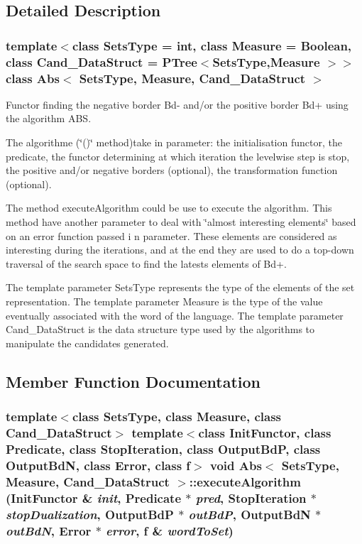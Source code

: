 \subsection{Detailed Description}
\subsubsection*{template$<$class Sets\-Type = int, class Measure = Boolean, class Cand\_\-Data\-Struct = PTree$<$Sets\-Type,Measure $>$$>$ class Abs$<$ Sets\-Type, Measure, Cand\_\-Data\-Struct $>$}

Functor finding the negative border Bd- and/or the positive border Bd+ using the algorithm ABS. 

The algorithme (\char`\"{}()\char`\"{} method)take in parameter: the initialisation functor, the predicate, the functor determining at which iteration the levelwise step is stop, the positive and/or negative borders (optional), the transformation function (optional).

The method execute\-Algorithm could be use to execute the algorithm. This method have another parameter to deal with \char`\"{}almost interesting elements\char`\"{} based on an error function passed i n parameter. These elements are considered as interesting during the iterations, and at the end they are used to do a top-down traversal of the search space to find the latests elements of Bd+.

The template parameter Sets\-Type represents the type of the elements of the set representation. The template parameter Measure is the type of the value eventually associated with the word of the language. The template parameter Cand\_\-Data\-Struct is the data structure type used by the algorithms to manipulate the candidates generated. 



\subsection{Member Function Documentation}
\subsubsection{\setlength{\rightskip}{0pt plus 5cm}template$<$class Sets\-Type, class Measure, class Cand\_\-Data\-Struct$>$ template$<$class Init\-Functor, class Predicate, class Stop\-Iteration, class Output\-Bd\-P, class Output\-Bd\-N, class Error, class f$>$ void {\bf Abs}$<$ Sets\-Type, Measure, Cand\_\-Data\-Struct $>$::execute\-Algorithm (Init\-Functor \& {\em init}, {\bf Predicate} $\ast$ {\em pred}, Stop\-Iteration $\ast$ {\em stop\-Dualization}, Output\-Bd\-P $\ast$ {\em out\-Bd\-P}, Output\-Bd\-N $\ast$ {\em out\-Bd\-N}, Error $\ast$ {\em error}, f \& {\em word\-To\-Set})\hspace{0.3cm}{\tt  [protected]}}\label{class_abs_33917103181d75de02278cb345c96c1a}



